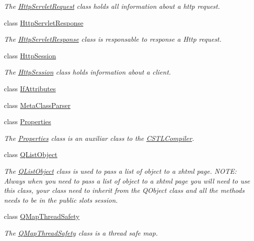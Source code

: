 \begin{DoxyCompactItemize}
\begin{DoxyCompactList}\small\item\em The \hyperlink{class_c_w_f_1_1_http_servlet_request}{Http\+Servlet\+Request} class holds all information about a http request. \end{DoxyCompactList}\item 
class \hyperlink{class_c_w_f_1_1_http_servlet_response}{Http\+Servlet\+Response}
\begin{DoxyCompactList}\small\item\em The \hyperlink{class_c_w_f_1_1_http_servlet_response}{Http\+Servlet\+Response} class is responsable to response a Http request. \end{DoxyCompactList}\item 
class \hyperlink{class_c_w_f_1_1_http_session}{Http\+Session}
\begin{DoxyCompactList}\small\item\em The \hyperlink{class_c_w_f_1_1_http_session}{Http\+Session} class holds information about a client. \end{DoxyCompactList}\item 
class \hyperlink{class_c_w_f_1_1_if_attributes}{If\+Attributes}
\item 
class \hyperlink{class_c_w_f_1_1_meta_class_parser}{Meta\+Class\+Parser}
\item 
class \hyperlink{class_c_w_f_1_1_properties}{Properties}
\begin{DoxyCompactList}\small\item\em The \hyperlink{class_c_w_f_1_1_properties}{Properties} class is an auxiliar class to the \hyperlink{class_c_w_f_1_1_c_s_t_l_compiler}{C\+S\+T\+L\+Compiler}. \end{DoxyCompactList}\item 
class \hyperlink{class_c_w_f_1_1_q_list_object}{Q\+List\+Object}
\begin{DoxyCompactList}\small\item\em The \hyperlink{class_c_w_f_1_1_q_list_object}{Q\+List\+Object} class is used to pass a list of object to a xhtml page. N\+O\+T\+E\+: Always when you need to pass a list of object to a xhtml page you will need to use this class, your class need to inherit from the Q\+Object class and all the methods needs to be in the public slots session. \end{DoxyCompactList}\item 
class \hyperlink{class_c_w_f_1_1_q_map_thread_safety}{Q\+Map\+Thread\+Safety}
\begin{DoxyCompactList}\small\item\em The \hyperlink{class_c_w_f_1_1_q_map_thread_safety}{Q\+Map\+Thread\+Safety} class is a thread safe map. \end{DoxyCompactList}\item 

\end{DoxyCompactItemize}
